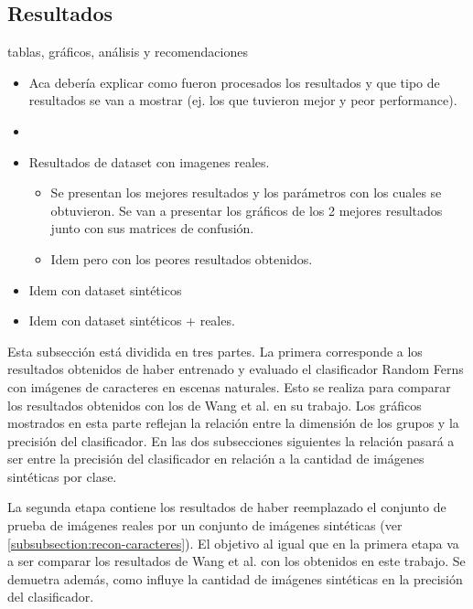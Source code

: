\newpage
\subsection{Resultados}
\label{subsection:resultados}
	tablas, gráficos, análisis y recomendaciones
	\begin{itemize}
		\item Aca debería explicar como fueron procesados los
                  resultados y que tipo de resultados se van a mostrar (ej. los
                  que tuvieron mejor y peor performance). 
                \item {}
		\item Resultados de dataset con imagenes reales.
		\begin{itemize}
			\item Se presentan los mejores resultados y los parámetros con los cuales se obtuvieron. Se van a presentar los gráficos de los 2 mejores resultados junto con sus matrices de confusión.
			\item Idem pero con los peores resultados obtenidos.
		\end{itemize}
		\item Idem con dataset sintéticos
		\item Idem con dataset sintéticos + reales.

	\end{itemize}
	
	Esta subsección está dividida en tres partes. La primera corresponde a los resultados obtenidos de haber entrenado y evaluado el clasificador Random Ferns con imágenes de caracteres en escenas naturales. Esto se realiza para comparar los resultados obtenidos con los de Wang et al. en su trabajo. Los gráficos mostrados en esta parte reflejan la relación entre la dimensión de los grupos y la precisión del clasificador. En las dos subsecciones siguientes la relación pasará a ser entre la precisión del clasificador en relación a la cantidad de imágenes sintéticas por clase.
	
	La segunda etapa contiene los resultados de haber reemplazado el conjunto de prueba de imágenes reales por un conjunto de imágenes sintéticas (ver \ref{subsubsection:recon-caracteres}). El objetivo al igual que en la primera etapa va a ser comparar los resultados de Wang et al. con los obtenidos en este trabajo. Se demuetra además, como influye la cantidad de imágenes sintéticas en la precisión del clasificador.
	
